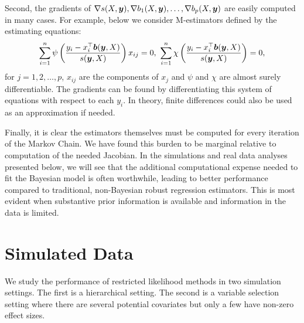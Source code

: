 \documentclass[ba]{imsart}
\newcommand{\by}{\mbox{\boldmath $y$}}
\newcommand{\bb}{\mbox{\boldmath $b$}}
\newcommand{\response}[1]{{\color{blue}#1}}
\begin{document}
Second, the gradients of $\nabla s(X,\by), \nabla b_1(X,\by),\dots, \nabla b_p(X,\by)$ are easily computed in many cases. For example, below we consider M-estimators defined by the estimating equations:
\begin{eqnarray}
\label{Mest}
 \sum_{i=1}^n \psi\left(\frac{y_i - x_{i}^{\top}\bb(\by,X)}{s(\by,X)}\right) x_{ij}=0, \
 \sum_{i=1}^n \chi\left(\frac{y_i - x_{i}^{\top}\bb(\by,X)}{s(\by,X)}\right)=0, 
 \end{eqnarray} 
for $j = 1, 2, \dots, p$, $x_{ij}$ are the components of $x_{j}$ and  $\psi$ and $\chi$ are almost surely differentiable. The gradients can be found by differentiating this system of equations with respect to each $y_{i}$. In theory, finite differences could also be used as an approximation if needed. 

Finally, it is clear the estimators themselves must be computed for every iteration of the Markov Chain. We have found this burden to be marginal relative to computation of the needed Jacobian. In the simulations and real data analyses presented below, we will see that the additional computational expense needed to fit the Bayesian model is often worthwhile, leading to better performance compared to traditional, non-Bayesian robust regression estimators.  This is most evident when substantive prior information is available and information in the data is limited.

%
%

\section{Simulated Data}
\label{simData}
We study the performance of restricted likelihood methods in two simulation settings. The first is a hierarchical setting. The second is a variable selection setting where there are several potential covariates but only a few have non-zero effect sizes.
\end{document}
